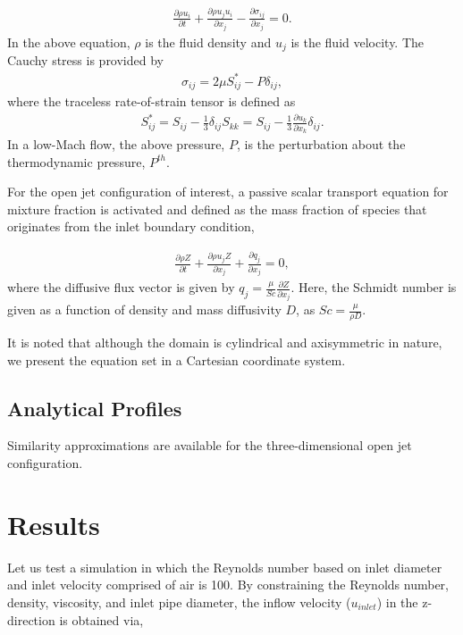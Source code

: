 \documentclass{article}
\begin{document}
\begin{align}
  \frac {\partial \rho u_i }{\partial t} + \frac{ \partial \rho u_j u_i}{\partial x_j} 
-\frac{\partial \sigma_{ij}}{\partial x_j} = 0.
\label{eq:momEq}
\end{align}
%
In the above equation, $\rho$ is the fluid density and $u_j$ is the fluid velocity. 
The Cauchy stress is provided by
\begin{align}
\sigma_{ij}  = 2 \mu S^*_{ij} - P \delta_{ij},
\end{align}
%
where the traceless rate-of-strain tensor is defined as
\begin{align}
S^*_{ij}  = S_{ij} - \frac{1}{3} \delta_{ij} S_{kk} \nonumber
		     = S_{ij} - \frac{1}{3} \frac{\partial  u_k }{\partial x_k}\delta_{ij}.
\end{align}
In a low-Mach flow, the above pressure, $P$, is the perturbation about the thermodynamic
pressure, $P^{th}$. 

For the open jet configuration of interest, a passive scalar transport equation for mixture 
fraction is activated and defined as the mass fraction of species that originates 
from the inlet boundary condition,

\begin{align}
  \frac {\partial \rho Z }{\partial t} + \frac{ \partial \rho u_j Z}{\partial x_j} 
+\frac{\partial q_j }{\partial x_j} = 0,
\label{eq:zEq}
\end{align}
where the diffusive flux vector is given by $q_j = \frac{\mu}{Sc}\frac{\partial Z}{\partial x_j}$.
Here, the Schmidt number is given as a function of density and mass diffusivity $D$, as
$Sc = \frac{\mu}{\rho D}$. 

It is noted that although the domain is cylindrical and axisymmetric in nature, we present
the equation set in a Cartesian coordinate system.

\subsection{Analytical Profiles}
Similarity approximations are available for the three-dimensional open jet configuration.

\section{Results}
Let us test a simulation in which the Reynolds number based on inlet diameter and 
inlet velocity comprised of air is 100. By constraining the Reynolds number, density, viscosity,
and inlet pipe diameter, the inflow velocity ($u_{inlet}$) in the z-direction is obtained via,
\end{document}
